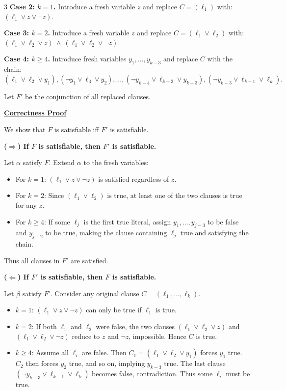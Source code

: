 \documentclass[letterpaper]{article}
\begin{document}
\begin{multicols*}{3}
    \textbf{Case 2: $k=1$.}
    Introduce a fresh variable $z$ and replace $C=(\ell_1)$ with:
    $
        (\ell_1 \vee z \vee \neg z).
    $

    \textbf{Case 3: $k=2$.}
    Introduce a fresh variable $z$ and replace $C=(\ell_1 \vee \ell_2)$ with:
    $
        (\ell_1 \vee \ell_2 \vee z) \ \wedge\  (\ell_1 \vee \ell_2 \vee \neg z).
    $

    \textbf{Case 4: $k \ge 4$.}
    Introduce fresh variables $y_1,\dots,y_{k-3}$ and replace $C$ with the chain:
    $
        (\ell_1 \vee \ell_2 \vee y_1),
        (\neg y_1 \vee \ell_3 \vee y_2),
        \dots,
        (\neg y_{k-4} \vee \ell_{k-2} \vee y_{k-3}),
        (\neg y_{k-3} \vee \ell_{k-1} \vee \ell_k).
    $

    Let $F'$ be the conjunction of all replaced clauses.

    \textbf{\underline{Correctness Proof}}

    We show that $F$ is satisfiable iff $F'$ is satisfiable.

    \textbf{($\Rightarrow$) If $F$ is satisfiable, then $F'$ is satisfiable.}

    Let $\alpha$ satisfy $F$. Extend $\alpha$ to the fresh variables:

    \begin{itemize}
        \item For $k=1$: $(\ell_1 \vee z \vee \neg z)$ is satisfied regardless of $z$.
        \item For $k=2$: Since $(\ell_1 \vee \ell_2)$ is true, at least one of the two clauses is true for any $z$.
        \item For $k\ge 4$: If some $\ell_j$ is the first true literal, assign $y_1,\dots,y_{j-3}$ to be false and $y_{j-2}$ to be true, making the clause containing $\ell_j$ true and satisfying the chain.
    \end{itemize}

    Thus all clauses in $F'$ are satisfied.

    \textbf{($\Leftarrow$) If $F'$ is satisfiable, then $F$ is satisfiable.}

    Let $\beta$ satisfy $F'$. Consider any original clause $C=(\ell_1,\dots,\ell_k)$.

    \begin{itemize}
        \item $k=1$: $(\ell_1 \vee z \vee \neg z)$ can only be true if $\ell_1$ is true.
        \item $k=2$: If both $\ell_1$ and $\ell_2$ were false, the two clauses $(\ell_1 \vee \ell_2 \vee z)$ and $(\ell_1 \vee \ell_2 \vee \neg z)$ reduce to $z$ and $\neg z$, impossible. Hence $C$ is true.
        \item $k\ge 4$: Assume all $\ell_i$ are false. Then $C_1=(\ell_1 \vee \ell_2 \vee y_1)$ forces $y_1$ true.
              $C_2$ then forces $y_2$ true, and so on, implying $y_{k-3}$ true.
              The last clause $(\neg y_{k-3} \vee \ell_{k-1} \vee \ell_k)$ becomes false, contradiction.
              Thus some $\ell_i$ must be true.
    \end{itemize}


\end{multicols*}
\end{document}
